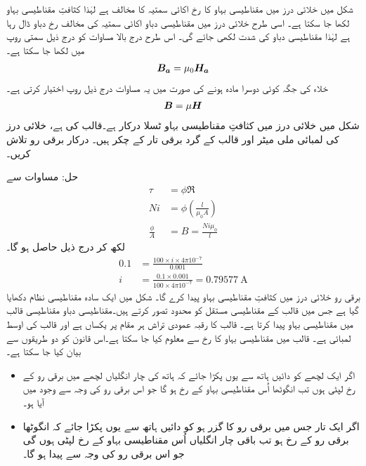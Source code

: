 شکل  میں خلائی درز میں مقناطیسی بہاو کا رخ  اکائی سمتیہ   کا مخالف ہے لہٰذا کثافتِ مقناطیسی بہاو  لکھا جا سکتا ہے۔ اسی طرح خلائی درز میں مقناطیسی دباو  اکائی سمتیہ  کی مخالف رخ دباو ڈال رہا ہے لہٰذا مقناطیسی دباو کی شدت   لکھی جائے گی۔ اس طرح درج بالا مساوات کو درج ذیل سمتی روپ میں  لکھا جا سکتا ہے۔
\begin{align}
{\ensuremath{{\boldsymbol{B_a}}}}=\mu_0 {{\boldsymbol{H_a}}}
\end{align}
خلاء کی جگہ کوئی دوسرا مادہ ہونے کی صورت میں یہ مساوات  درج ذیل روپ اختیار کرتی ہے۔
\begin{align}
{\ensuremath{{\boldsymbol{B}}}}=\mu {\ensuremath{{\boldsymbol{H}}}}
\end{align}
%
شکل  میں خلائی درز میں کثافتِ مقناطیسی بہاو  ٹسلا درکار ہے۔قالب کی   ہے، خلائی درز کی لمبائی  ملی میٹر اور  قالب کے گرد برقی تار کے چکر   ہیں۔ درکار برقی رو  تلاش کریں۔

حل:\quad
مساوات  سے 
\begin{align*}
\tau&=\phi \Re\\
N i &= \phi \left(\frac{l}{\mu_0 A} \right)\\
\frac{\phi}{A}&=B=\frac{ N i \mu_0}{l}
\end{align*}
لکھ کر درج ذیل حاصل ہو گا۔
\begin{align*}
0.1&=\frac{100 \times i \times 4 \pi  10^{-7}}{0.001}\\
i&=\frac{0.1 \times 0.001}{100 \times 4 \pi  10^{-7}}=\SI{0.79577}{\ampere}
\end{align*}
 برقی رو  خلائی درز میں  کثافتِ مقناطیسی بہاو پیدا کرے گا۔
%
شکل  میں ایک سادہ مقناطیسی نظام دکھایا گیا ہے جس میں قالب کے مقناطیسی مستقل کو محدود تصور کرتے ہیں۔مقناطیسی دباو   مقناطیسی قالب میں مقناطیسی بہاو  پیدا کرتا ہے۔ قالب کا رقبہ عمودی تراش   ہر مقام پر  یکساں ہے اور قالب  کی اوسط لمبائی  ہے۔ قالب میں مقناطیسی بہاو  کا رخ
    سے معلوم کیا جا سکتا ہے۔اس قانون کو دو طریقوں سے بیان کیا جا سکتا ہے۔
\begin{itemize}
\item
اگر ایک لچھے کو دائیں ہاتھ سے یوں پکڑا  جائے کہ ہاتھ کی چار انگلیاں لچھے میں برقی رو کے رخ لپٹی  ہوں تب انگوٹھا اُس مقناطیسی بہاو کے رخ ہو گا جو اس برقی رو کی وجہ سے وجود میں آیا ہو۔
\item
اگر ایک تار جس میں برقی رو کا گزر ہو کو دائیں ہاتھ سے یوں پکڑا جائے کہ انگوٹھا  برقی رو  کے رخ ہو تب باقی چار انگلیاں اُس مقناطیسی  بہاو کے رخ لپٹی ہوں گی  جو اس برقی رو کی وجہ سے  پیدا ہو گا۔
\end{itemize}

